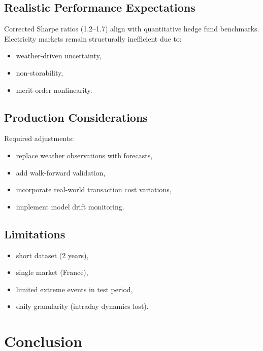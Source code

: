 \documentclass[11pt,a4paper]{article}
\begin{document}
\subsection{Realistic Performance Expectations}

Corrected Sharpe ratios (1.2–1.7) align with quantitative hedge fund benchmarks.  
Electricity markets remain structurally inefficient due to:
\begin{itemize}
    \item weather-driven uncertainty,
    \item non-storability,
    \item merit-order nonlinearity.
\end{itemize}

\subsection{Production Considerations}

Required adjustments:
\begin{itemize}
    \item replace weather observations with forecasts,
    \item add walk-forward validation,
    \item incorporate real-world transaction cost variations,
    \item implement model drift monitoring.
\end{itemize}

\subsection{Limitations}

\begin{itemize}
    \item short dataset (2 years),
    \item single market (France),
    \item limited extreme events in test period,
    \item daily granularity (intraday dynamics lost).
\end{itemize}

\section{Conclusion}
\end{document}
